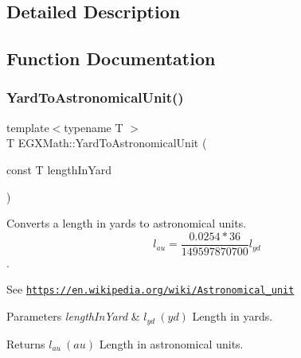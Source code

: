 \subsection{Detailed Description}


\subsection{Function Documentation}
\mbox{\label{group___e_g_x_math-_conversions-_length_conversions-_imperial-_yard-_astronomical_gae62795f30f07c62e0082725518bc0369}} 
\subsubsection{\texorpdfstring{Yard\+To\+Astronomical\+Unit()}{YardToAstronomicalUnit()}}
{\footnotesize\ttfamily template$<$typename T $>$ \\
T E\+G\+X\+Math\+::\+Yard\+To\+Astronomical\+Unit (\begin{DoxyParamCaption}\item[{const T}]{length\+In\+Yard }\end{DoxyParamCaption})}



Converts a length in yards to astronomical units. \[ l_{au}=\frac{0.0254 * 36}{149597870700} l_{yd} \]. 

See \href{https://en.wikipedia.org/wiki/Astronomical_unit}{\tt https\+://en.\+wikipedia.\+org/wiki/\+Astronomical\+\_\+unit} 
\begin{DoxyParams}{Parameters}
{\em length\+In\+Yard} & $ l_{yd}\ (yd)$ Length in yards. \\
\hline
\end{DoxyParams}
\begin{DoxyReturn}{Returns}
$ l_{au}\ (au)$ Length in astronomical units. 
\end{DoxyReturn}
\mbox{\label{group___e_g_x_math-_conversions-_length_conversions-_imperial-_yard-_astronomical_ga7e91cb1696861e32c239712c901f369f}} 
